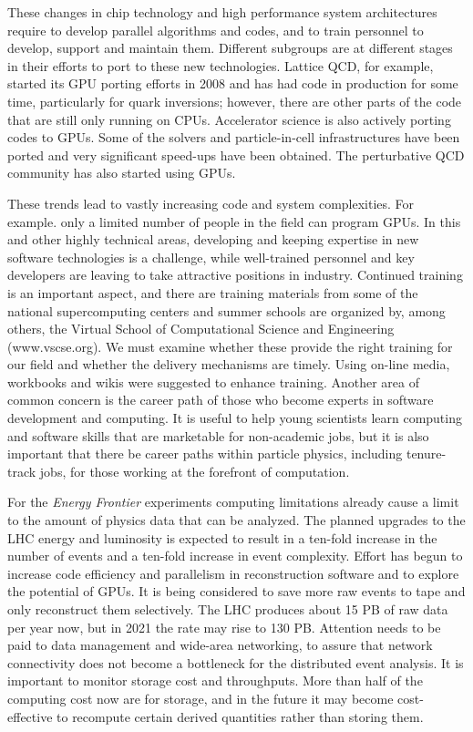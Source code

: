 These changes in chip technology and high performance system architectures
require to develop parallel algorithms and codes, and to train personnel to
develop, support and maintain them. Different subgroups are at different
stages in their efforts to port to these new technologies. Lattice QCD, for
example, started its GPU porting efforts in 2008 and has had code in
production for some time, particularly for quark inversions; however, there
are other parts of the code that are still only running on CPUs.
Accelerator science is also actively porting codes to GPUs. Some of the
solvers and particle-in-cell infrastructures have been ported and very
significant speed-ups have been obtained. The perturbative QCD community
has also started using GPUs.

These trends lead to vastly increasing code and system complexities. For
example. only a limited number of people in the field can program GPUs. In
this and other highly technical areas, developing and keeping expertise in
new software technologies is a challenge, while well-trained personnel and
key developers are leaving to take attractive positions in industry.
Continued training is an important aspect, and there are training materials
from some of the national supercomputing centers and summer schools are
organized by, among others, the Virtual School of Computational Science and
Engineering (www.vscse.org). We must examine whether these provide the
right training for our field and whether the delivery mechanisms are
timely. Using on-line media, workbooks and wikis were suggested to enhance
training. Another area of common concern is the career path of those who
become experts in software development and computing. It is useful to help
young scientists learn computing and software skills that are marketable
for non-academic jobs, but it is also important that there be career paths
within particle physics, including tenure-track jobs, for those working at
the forefront of computation.

For the {\it Energy Frontier} experiments computing limitations already
cause a limit to the amount of physics data that can be analyzed. The
planned upgrades to the LHC energy and luminosity is expected to result in
a ten-fold increase in the number of events and a ten-fold increase in
event complexity. Effort has begun to increase code efficiency and
parallelism in reconstruction software and to explore the potential of
GPUs. It is being considered to save more raw events to tape and only
reconstruct them selectively. The LHC produces about 15 PB of raw data per
year now, but in 2021 the rate may rise to 130 PB. Attention needs to be
paid to data management and wide-area networking, to assure that network
connectivity does not become a bottleneck for the distributed event
analysis. It is important to monitor storage cost and throughputs. More
than half of the computing cost now are for storage, and in the future it
may become cost-effective to recompute certain derived quantities rather
than storing them.

